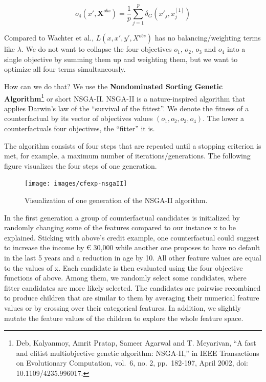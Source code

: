 \documentclass[
  12pt,
]{krantz}
\begin{document}
\[o_4(x',\textbf{X}^{obs})=\frac{1}{p}\sum_{j=1}^{p}\delta_G(x'_j,x^{[1]}_j)\]

Compared to Wachter et al., \(L(x,x',y',X^{obs})\) has no balancing/weighting terms like \(\lambda\).
We do not want to collapse the four objectives \(o_1\), \(o_2\), \(o_3\) and \(o_4\) into a single objective by summing them up and weighting them, but we want to optimize all four terms simultaneously.

How can we do that?
We use the \textbf{Nondominated Sorting Genetic Algorithm}\footnote{Deb, Kalyanmoy, Amrit Pratap, Sameer Agarwal and T. Meyarivan, ``A fast and elitist multiobjective genetic algorithm: NSGA-II,'' in IEEE Transactions on Evolutionary Computation, vol.~6, no. 2, pp.~182-197, April 2002, doi: 10.1109/4235.996017.} or short NSGA-II.
NSGA-II is a nature-inspired algorithm that applies Darwin's law of the ``survival of the fittest''.
We denote the fitness of a counterfactual by its vector of objectives values \((o_1,o_2,o_3,o_4)\).
The lower a counterfactuals four objectives, the ``fitter'' it is.

The algorithm consists of four steps that are repeated until a stopping criterion is met, for example, a maximum number of iterations/generations.
The following figure visualizes the four steps of one generation.

\begin{figure}

{\centering \texttt{[image: images/cfexp-nsgaII]} 

}

\caption{Visualization of one generation of the NSGA-II algorithm.}\label{fig:nsgaII-cf}
\end{figure}

In the first generation a group of counterfactual candidates is initialized by randomly changing some of the features compared to our instance x to be explained.
Sticking with above's credit example, one counterfactual could suggest to increase the income by € 30,000 while another one proposes to have no default in the last 5 years and a reduction in age by 10.
All other feature values are equal to the values of x.
Each candidate is then evaluated using the four objective functions of above.
Among them, we randomly select some candidates, where fitter candidates are more likely selected.
The candidates are pairwise recombined to produce children that are similar to them by averaging their numerical feature values or by crossing over their categorical features.
In addition, we slightly mutate the feature values of the children to explore the whole feature space.
\end{document}
